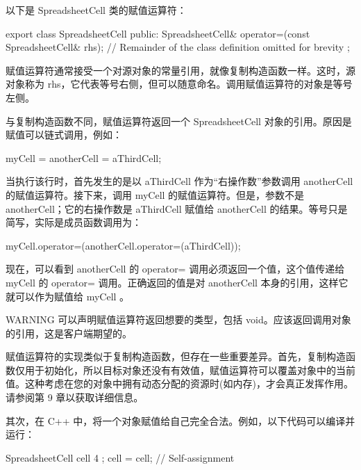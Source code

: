 
以下是 SpreadsheetCell 类的赋值运算符：

\begin{cpp}
export class SpreadsheetCell
{
    public:
        SpreadsheetCell& operator=(const SpreadsheetCell& rhs);
        // Remainder of the class definition omitted for brevity
};
\end{cpp}

赋值运算符通常接受一个对源对象的常量引用，就像复制构造函数一样。这时，源对象称为 rhs，它代表等号右侧，但可以随意命名。调用赋值运算符的对象是等号左侧。

与复制构造函数不同，赋值运算符返回一个 SpreadsheetCell 对象的引用。原因是赋值可以链式调用，例如：

\begin{cpp}
myCell = anotherCell = aThirdCell;
\end{cpp}

当执行该行时，首先发生的是以 aThirdCell 作为“右操作数”参数调用 anotherCell 的赋值运算符。接下来，调用 myCell 的赋值运算符。但是，参数不是 anotherCell；它的右操作数是 aThirdCell 赋值给 anotherCell 的结果。等号只是简写，实际是成员函数调用为：

\begin{cpp}
myCell.operator=(anotherCell.operator=(aThirdCell));
\end{cpp}

现在，可以看到 anotherCell 的 operator= 调用必须返回一个值，这个值传递给 myCell 的 operator= 调用。正确返回的值是对 anotherCell 本身的引用，这样它就可以作为赋值给 myCell 。

\begin{myWarning}{WARNING}
可以声明赋值运算符返回想要的类型，包括 void。应该返回调用对象的引用，这是客户端期望的。
\end{myWarning}


赋值运算符的实现类似于复制构造函数，但存在一些重要差异。首先，复制构造函数仅用于初始化，所以目标对象还没有有效值，赋值运算符可以覆盖对象中的当前值。这种考虑在您的对象中拥有动态分配的资源时(如内存)，才会真正发挥作用。请参阅第 9 章以获取详细信息。

其次，在 C++ 中，将一个对象赋值给自己完全合法。例如，以下代码可以编译并运行：

\begin{cpp}
SpreadsheetCell cell { 4 };
cell = cell; // Self-assignment
\end{cpp}

